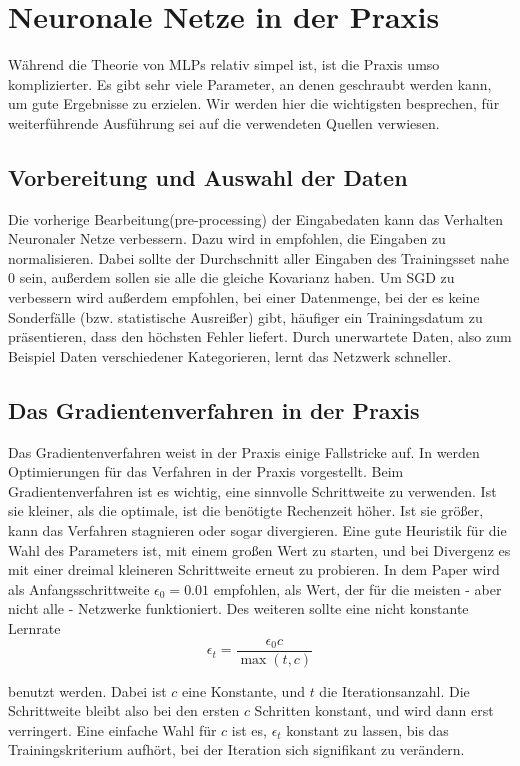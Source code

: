 \section{Neuronale Netze in der Praxis}
Während die Theorie von MLPs relativ simpel ist, ist die Praxis umso komplizierter. Es gibt sehr viele Parameter, an denen geschraubt werden kann, um gute Ergebnisse zu erzielen. Wir werden hier die wichtigsten besprechen, für weiterführende Ausführung sei auf die verwendeten Quellen verwiesen. 

\subsection{Vorbereitung und Auswahl der Daten}
Die vorherige Bearbeitung(pre-processing) der Eingabedaten kann das Verhalten Neuronaler Netze verbessern. 
Dazu wird in \cite{lecunefficient} empfohlen, die Eingaben zu normalisieren.
Dabei sollte der Durchschnitt aller Eingaben des Trainingsset nahe $0$ sein, außerdem sollen sie alle die gleiche Kovarianz haben.
Um SGD zu verbessern wird außerdem empfohlen, bei einer Datenmenge, bei der es keine Sonderfälle (bzw. statistische Ausreißer) gibt, häufiger ein Trainingsdatum zu präsentieren, dass den höchsten Fehler liefert. Durch unerwartete Daten, also zum Beispiel Daten verschiedener Kategorieren, lernt das Netzwerk schneller.

\subsection{Das Gradientenverfahren in der Praxis}
Das Gradientenverfahren weist in der Praxis einige Fallstricke auf. In \cite{bengio2012practical} werden Optimierungen für das Verfahren in der Praxis vorgestellt. 
Beim Gradientenverfahren ist es wichtig, eine sinnvolle Schrittweite zu verwenden. Ist sie kleiner, als die optimale, ist die benötigte Rechenzeit höher. Ist sie größer, kann das Verfahren stagnieren oder sogar divergieren. Eine gute Heuristik für die Wahl des Parameters ist, mit einem großen Wert zu starten, und bei Divergenz es mit einer dreimal kleineren Schrittweite erneut zu probieren.
In dem Paper wird als Anfangsschrittweite $\epsilon_0 = 0.01$ empfohlen, als Wert, der für die meisten - aber nicht alle - Netzwerke funktioniert.
Des weiteren sollte eine nicht konstante Lernrate 
\begin{equation}
	\epsilon_t = \frac{\epsilon_0 c}{\max(t, c)}
\end{equation}

benutzt werden. Dabei ist $c$ eine Konstante, und $t$ die Iterationsanzahl. Die Schrittweite bleibt also bei den ersten $c$ Schritten konstant, und wird dann erst verringert. Eine einfache Wahl für $c$ ist es, $\epsilon_t$ konstant zu lassen, bis das Trainingskriterium aufhört, bei der Iteration sich signifikant zu verändern.

